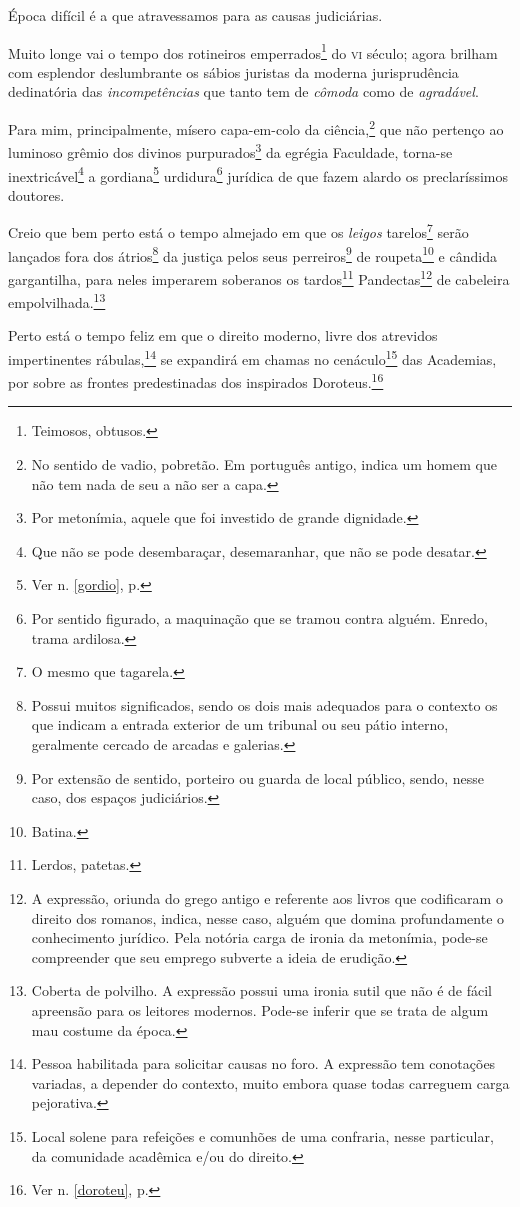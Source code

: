 Época difícil é a que atravessamos para as causas judiciárias.

Muito longe vai o tempo dos rotineiros emperrados\footnote{Teimosos,
  obtusos.} do \textsc{vi} século; agora brilham com esplendor deslumbrante os
sábios juristas da moderna jurisprudência dedinatória das
\emph{incompetências} que tanto tem de \emph{cômoda} como de
\emph{agradável}.

Para mim, principalmente, mísero capa-em-colo da ciência,\footnote{No
  sentido de vadio, pobretão. Em português antigo, indica um homem que
  não tem nada de seu a não ser a capa.} que não pertenço ao luminoso
grêmio dos divinos purpurados\footnote{Por metonímia, aquele que foi
  investido de grande dignidade.} da egrégia Faculdade, torna-se
inextricável\footnote{Que não se pode desembaraçar, desemaranhar, que
  não se pode desatar.} a gordiana\footnote{Ver n. \ref{gordio}, p. \pageref{gordio}}
urdidura\footnote{Por sentido figurado, a maquinação que se tramou
  contra alguém. Enredo, trama ardilosa.} jurídica de que fazem alardo
os preclaríssimos doutores.

Creio que bem perto está o tempo almejado em que os \emph{leigos}
tarelos\footnote{O mesmo que tagarela.} serão lançados fora dos
átrios\footnote{Possui muitos significados, sendo os dois mais
  adequados para o contexto os que indicam a entrada exterior de um
  tribunal ou seu pátio interno, geralmente cercado de arcadas e
  galerias.} da justiça pelos seus perreiros\footnote{Por extensão de
  sentido, porteiro ou guarda de local público, sendo, nesse caso, dos
  espaços judiciários.} de roupeta\footnote{Batina.} e cândida
gargantilha, para neles imperarem soberanos os tardos\footnote{Lerdos,
  patetas.} Pandectas\footnote{A expressão, oriunda do grego antigo e
  referente aos livros que codificaram o direito dos romanos, indica,
  nesse caso, alguém que domina profundamente o conhecimento jurídico.
  Pela notória carga de ironia da metonímia, pode-se compreender que seu
  emprego subverte a ideia de erudição.} de cabeleira
empolvilhada.\footnote{Coberta de polvilho. A expressão possui uma
  ironia sutil que não é de fácil apreensão para os leitores modernos.
  Pode-se inferir que se trata de algum mau costume da época.}

Perto está o tempo feliz em que o direito moderno, livre dos atrevidos
impertinentes rábulas,\footnote{Pessoa habilitada para solicitar causas
  no foro. A expressão tem conotações variadas, a depender do contexto,
  muito embora quase todas carreguem carga pejorativa.} se expandirá em
chamas no cenáculo\footnote{Local solene para refeições e comunhões de
  uma confraria, nesse particular, da comunidade acadêmica e/ou do
  direito.} das Academias, por sobre as frontes predestinadas dos
inspirados Doroteus.\footnote{Ver n. \ref{doroteu}, p. \pageref{doroteu}}


